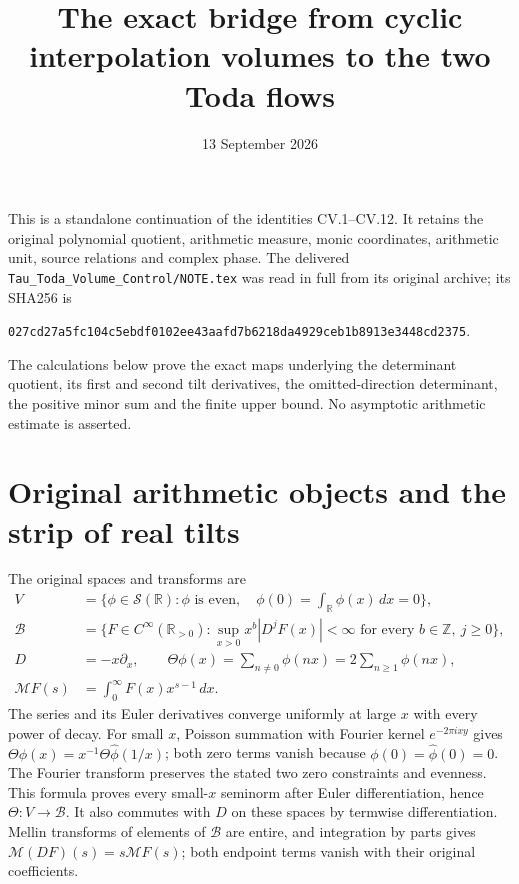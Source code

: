 \documentclass[11pt]{article}
\title{The exact bridge from cyclic interpolation volumes to the two Toda flows}
\author{}
\date{13 September 2026}
\newcommand{\R}{\mathbb R}
\begin{document}
\maketitle

This is a standalone continuation of the identities CV.1--CV.12. It
retains the original polynomial quotient, arithmetic measure, monic
coordinates, arithmetic unit, source relations and complex phase. The
delivered \texttt{Tau\_Toda\_Volume\_Control/NOTE.tex} was read in full
from its original archive; its SHA256 is
\begin{center}\footnotesize
\texttt{027cd27a5fc104c5ebdf0102ee43aafd7b6218da4929ceb1b8913e3448cd2375}.
\end{center}
The calculations below prove the exact maps underlying the determinant
quotient, its first and second tilt derivatives, the omitted-direction
determinant, the positive minor sum and the finite upper bound. No
asymptotic arithmetic estimate is asserted.

\section{Original arithmetic objects and the strip of real tilts}

The original spaces and transforms are
\[
 \begin{split}
 V&=\{\phi\in\mathcal S(\R):\phi\text{ is even},\quad
                     \phi(0)=\int_\R\phi(x)\,dx=0\},\\
 \mathscr B&=\{F\in C^\infty(\R_{>0}):
       \sup_{x>0}x^b|D^jF(x)|<\infty
           \text{ for every }b\in\mathbb Z,\ j\ge0\},\\
 D&=-x\partial_x,\qquad
 \Theta\phi(x)=\sum_{n\ne0}\phi(nx)=2\sum_{n\ge1}\phi(nx),\\
 \mathcal MF(s)&=\int_0^\infty F(x)x^{s-1}\,dx.
 \end{split}
\]
The series and its Euler derivatives converge uniformly at large
$x$ with every power of decay. For small $x$, Poisson summation
with Fourier kernel $e^{-2\pi ixy}$ gives
$\Theta\phi(x)=x^{-1}\Theta\widehat\phi(1/x)$; both zero terms
vanish because $\phi(0)=\widehat\phi(0)=0$.
The Fourier transform preserves the stated two zero constraints
and evenness. This formula proves every small-$x$ seminorm after
Euler differentiation, hence $\Theta:V\to\mathscr B$.
It also commutes with $D$ on these spaces by termwise differentiation.
Mellin transforms of elements of $\mathscr B$ are entire, and
integration by parts gives $\mathcal M(DF)(s)=s\mathcal MF(s)$;
both endpoint terms vanish with their original coefficients.
\end{document}
